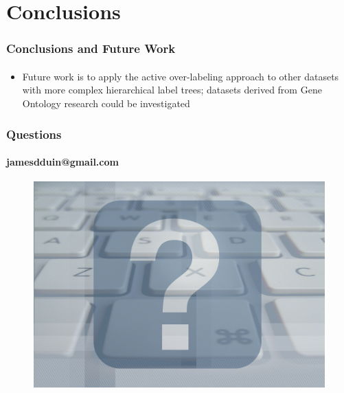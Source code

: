 \documentclass{beamer}
\begin{document}
\section{Conclusions}
\begin{frame}
    \frametitle{Conclusions and Future Work}
    \framesubtitle{}
    \begin{itemize}
      \item Future work is to apply the active over-labeling approach
      to other datasets with more complex hierarchical label trees;
      datasets derived from Gene Ontology research could be investigated
    \end{itemize}
\end{frame}


\begin{frame}
    \frametitle{Questions}
    \framesubtitle{jamesdduin@gmail.com}
    \begin{figure}[!htb]
        \centering
        \includegraphics[width=1.0\columnwidth]{fig/question}
        \label{fig:question}
    \end{figure}
\end{frame}
\end{document}
